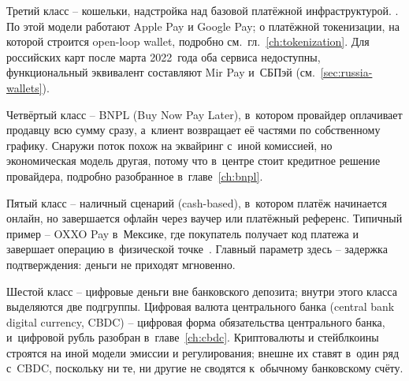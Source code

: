 Третий класс -- кошельки, надстройка над базовой платёжной
инфраструктурой. .
По этой модели работают Apple Pay и Google Pay; о платёжной
токенизации, на которой строится open-loop wallet, подробно
см.~гл.~\ref{ch:tokenization}. Для российских карт
после марта 2022~года оба сервиса недоступны, функциональный
эквивалент составляют Mir Pay и~СБПэй (см.~\ref{sec:russia-wallets}).

Четвёртый класс -- BNPL (Buy Now Pay Later), в~котором провайдер
оплачивает продавцу всю сумму сразу, а~клиент возвращает её частями по
собственному графику. Снаружи поток похож на эквайринг с~иной
комиссией, но экономическая модель другая, потому что в~центре стоит
кредитное решение провайдера, подробно разобранное в~главе~\ref{ch:bnpl}.

Пятый класс -- наличный сценарий (cash-based), в~котором платёж
начинается онлайн, но завершается офлайн через ваучер или платёжный референс.
Типичный пример -- OXXO Pay в~Мексике, где покупатель получает код
платежа и завершает операцию в~физической точке~\cite{oxxo-pay}.
Главный параметр здесь -- задержка подтверждения: деньги
не приходят мгновенно.

Шестой класс -- цифровые деньги вне банковского депозита; внутри
этого класса выделяются две подгруппы. Цифровая валюта центрального
банка (central bank digital currency, CBDC) -- цифровая форма
обязательства центрального банка, и~цифровой рубль
разобран в~главе~\ref{ch:cbdc}. Криптовалюты и стейблкоины
строятся на иной модели эмиссии и регулирования; внешне их ставят
в~один ряд с~CBDC, поскольку ни те, ни другие не сводятся
к~обычному банковскому счёту.


